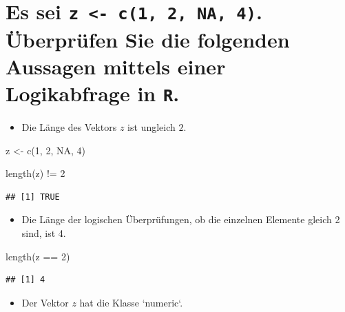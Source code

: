 \documentclass[12pt,a4paper]{article}
\newenvironment{Shaded}{\begin{snugshade}}{\end{snugshade}}
\newcommand{\ConstantTok}[1]{\textcolor[rgb]{0.00,0.00,0.00}{#1}}
\newcommand{\DecValTok}[1]{\textcolor[rgb]{0.00,0.00,0.81}{#1}}
\newcommand{\FunctionTok}[1]{\textcolor[rgb]{0.00,0.00,0.00}{#1}}
\newcommand{\NormalTok}[1]{#1}
\newcommand{\OtherTok}[1]{\textcolor[rgb]{0.56,0.35,0.01}{#1}}
\newcommand{\SpecialCharTok}[1]{\textcolor[rgb]{0.00,0.00,0.00}{#1}}
\begin{document}
\hypertarget{es-sei-z---c1-2-na-4.-uxfcberpruxfcfen-sie-die-folgenden-aussagen-mittels-einer-logikabfrage-in-r.}{%
\section{\texorpdfstring{Es sei
\texttt{z\ \textless{}-\ c(1,\ 2,\ NA,\ 4)}. Überprüfen Sie die
folgenden Aussagen mittels einer Logikabfrage in
\texttt{R}.}{Es sei z \textless- c(1, 2, NA, 4). Überprüfen Sie die folgenden Aussagen mittels einer Logikabfrage in R.}}\label{es-sei-z---c1-2-na-4.-uxfcberpruxfcfen-sie-die-folgenden-aussagen-mittels-einer-logikabfrage-in-r.}}

\begin{itemize}
  \item Die Länge des Vektors $z$ ist ungleich $2$.
\end{itemize}

\begin{Shaded}
\begin{Highlighting}[]
\NormalTok{    z }\OtherTok{\textless{}{-}} \FunctionTok{c}\NormalTok{(}\DecValTok{1}\NormalTok{, }\DecValTok{2}\NormalTok{, }\ConstantTok{NA}\NormalTok{, }\DecValTok{4}\NormalTok{)}
    
    \FunctionTok{length}\NormalTok{(z) }\SpecialCharTok{!=} \DecValTok{2}
\end{Highlighting}
\end{Shaded}

\begin{verbatim}
## [1] TRUE
\end{verbatim}

\begin{itemize}
  \item Die Länge der logischen Überprüfungen, ob die einzelnen Elemente gleich 2 sind, ist 4.
\end{itemize}

\begin{Shaded}
\begin{Highlighting}[]
    \FunctionTok{length}\NormalTok{(z }\SpecialCharTok{==} \DecValTok{2}\NormalTok{)}
\end{Highlighting}
\end{Shaded}

\begin{verbatim}
## [1] 4
\end{verbatim}

\begin{itemize}
  \item Der Vektor $z$ hat die Klasse `numeric`.
\end{itemize}
\end{document}
